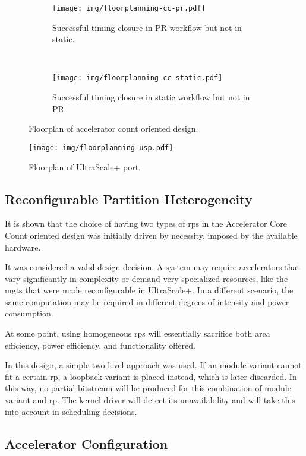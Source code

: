 \begin{figure}[htb!]
\centering
\begin{subfigure}[h]{\textwidth}
	\centering
	\texttt{[image: img/floorplanning-cc-pr.pdf]}
	\caption{Successful timing closure in PR workflow but not in static.}
\end{subfigure}
\\
\begin{subfigure}[h]{\textwidth}
	\centering
	\texttt{[image: img/floorplanning-cc-static.pdf]}
	\caption{Successful timing closure in static workflow but not in PR.}
\end{subfigure}
\caption{Floorplan of accelerator count oriented design.}
\label{fig:floorplanning-cc}
\end{figure}

\begin{figure}[htb!]
\centering
	\texttt{[image: img/floorplanning-usp.pdf]}
\caption{Floorplan of UltraScale+ port.}
\label{fig:floorplanning-usp}
\end{figure}

\subsection{Reconfigurable Partition Heterogeneity}

It is shown that the choice of having two types of \glspl{rp} in the
Accelerator Core Count oriented design was initially driven by necessity, 
imposed by the available hardware.

It was considered a valid design decision.
A system may require accelerators that
vary significantly in complexity or demand very specialized resources,
like the \glspl{mgt} that were made reconfigurable in UltraScale+.
In a different scenario, the same computation may be required in different
degrees of intensity and power consumption.

At some point, using homogeneous \glspl{rp} will essentially sacrifice both
area efficiency, power efficiency, and functionality offered.

In this design, a simple two-level approach was used. If an module variant
cannot fit a certain \gls{rp}, a loopback variant is placed instead, which is later discarded.
In this way, no partial bitstream will be produced for this combination of module variant and \gls{rp}.
The kernel driver will detect its unavailability and will take this into account in scheduling decisions.

\subsection{Accelerator Configuration}

